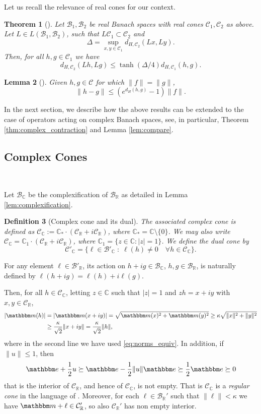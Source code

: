 \documentclass{amsart}
\numberwithin{equation}{section}
\newtheorem{thm}{Theorem}[section]
\newtheorem{lem}[thm]{Lemma}
\newtheorem{defin}[thm]{Definition}
\newcommand\cB{{\mathcal B}}
\newcommand\cC{{\mathcal C}}
\newcommand\bC{{\mathbb C}}
\newcommand\bR{{\mathbb R}}
\newcommand{\bbe}{\mathbbm e}
\newcommand{\bbm}{\mathbbm m}
\begin{document}
Let us recall the relevance of real cones for our context. 
\begin{thm}[{\cite[Theorem 1.1]{Li95}}]\label{thm:real_contraction}
Let $\cB_1,\cB_2$ be real Banach spaces with real cones $\cC_1,\cC_2$ as above.  Let $L\in L(\cB_1,\cB_2)$, such that $L\cC_1\subset \cC_2$ and 
\[
\Delta=\sup_{x,y\in\cC_1}d_{H,\cC_2}(Lx,Ly). 
\]
Then, for all $h,g\in\cC_1$ we have
\[
d_{H,\cC_2}(Lh,Lg)\leq \tanh(\Delta/4)d_{H,\cC_1}(h,g).
\]
\end{thm}
\begin{lem}[{\cite[Lemma 1.3]{Li95}}] 
Given $h,g\in\cC$ for which $\|f\|=\|g\|$,
\[
\|h-g\|\leq \left(e^{d_H(h,g)}-1\right)\|f\|.
\]
\end{lem}
In the next section, we describe how the above results can be extended to the case of operators acting on complex Banach spaces, see, in particular, Theorem \ref{thm:complex_contraction} and Lemma \ref{lem:compare}.


\subsection{Complex Cones}\ \\
\label{sec:complexcones}


Let $\cB_\bC$ be the complexification of $\cB_\bR$ as detailed in Lemma \ref{lem:complexification}.

\begin{defin}[Complex cone and its dual]
\label{def:complex cone}
The associated complex cone is defined as $\cC_\bC:=\bC_* \cdot (\cC_\bR+i\cC_{\bR})$, where $\bC_*=\bC\setminus\{0\}$.
We may also write $\cC_\bC = \bC_1 \cdot (\cC_\bR + i \cC_\bR)$, where $\bC_1 = \{ z \in \bC : |z| =1 \}$.
We define the dual cone by 
\[
\cC'_\bC=\{\ell\in \cB'_\bC\;:\; \ell(h)\neq 0\quad \forall h\in\cC_\bC\} .
\]
\end{defin}
For any element $\ell\in\cB'_\bR$, its action on $h+ig\in\cB_\bC$, $h,g \in \cB_\bR$, is naturally defined by $\ell(h+ig)=\ell(h)+i\ell(g)$.

Then, for all $h\in\cC_{\bC}$, letting $z\in\bC$  such that $|z|=1$ and  $zh=x+iy$ with $x,y\in \cC_{\bR}$,
\begin{equation}\label{eq:m_lower}
\begin{split}
| \bbm(h) |&=|\bbm(x+iy)|=\sqrt{\bbm(x)^2+\bbm(y)^2}\geq \kappa\sqrt{\|x\|^2+\|y\|^2}\\
&\geq \frac{\kappa}{\sqrt 2}\|x+iy\|= \frac{\kappa}{\sqrt 2}{ \| h \| } ,
\end{split}
\end{equation}
where in the second line we have used \eqref{eq:norms_equiv}.
In addition, if $\|u\|\leq 1$, then
\[
\bbe+\frac 12u\succeq \bbe-\frac 12\|u\|\bbe\succeq \frac 12\bbe\succeq 0
\]
that is the interior of $\cC_\bR$, and hence of $\cC_\bC$, is not empty. That is $\cC_\bC$ is a {\em regular cone} in the language of \cite[Defintion 3.2-(3)]{Ru10}. Moreover, for  each $\ell\in\cB_\bR'$ such that $\|\ell\|<\kappa$ we have $\bbm+\ell\in\cC_\bR'$, so also $\cC_{\bR}'$ has non empty interior.
\end{document}
